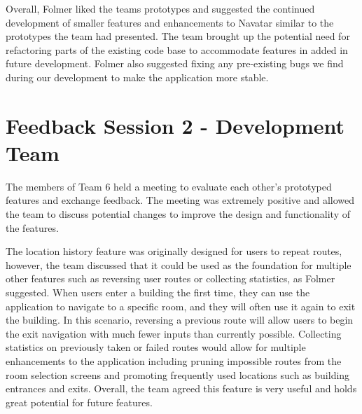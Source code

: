 \documentclass{scrreprt}
\begin{document}
	Overall, Folmer liked the teams prototypes and suggested the continued development of smaller features and enhancements to Navatar similar to the prototypes the team had presented. The team brought up the potential need for refactoring parts of the existing code base to accommodate features in added in future development. Folmer also suggested fixing any pre-existing bugs we find during our development to make the application more stable.

\pagebreak

\section{Feedback Session 2 - Development Team}

The members of Team 6 held a meeting to evaluate each other’s prototyped features and exchange feedback. The meeting was extremely positive and allowed the team to discuss potential changes to improve the design and functionality of the features.

	The location history feature was originally designed for users to repeat routes, however, the team discussed that it could be used as the foundation for multiple other features such as reversing user routes or collecting statistics, as Folmer suggested. When users enter a building the first time, they can use the application to navigate to a specific room, and they will often use it again to exit the building. In this scenario, reversing a previous route will allow users to begin the exit navigation with much fewer inputs than currently possible. Collecting statistics on previously taken or failed routes would allow for multiple enhancements to the application including pruning impossible routes from the room selection screens and promoting frequently used locations such as building entrances and exits. Overall, the team agreed this feature is very useful and holds great potential for future features.
	
\end{document}
